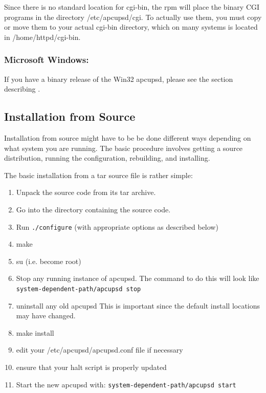 Since there is no standard location for cgi-bin, the rpm will place the binary
CGI programs in the directory /etc/apcupsd/cgi. To actually use them, you must
copy or move them to your actual cgi-bin directory, which on many systems is
located in /home/httpd/cgi-bin. 

\label{Microsoft-Windows}

\subsubsection*{Microsoft Windows:}

\label{index-Installing_002c-Microsoft-21}
If you have a binary release of the Win32 apcupsd, please see the section
describing
.

\label{Installation-from-Source}

\subsection*{Installation from Source}

Installation from source might have to be be done different ways depending on
what system you are running. The basic procedure involves getting a source
distribution, running the configuration, rebuilding, and installing.  

The basic installation from a tar source file is rather simple:  

\begin{enumerate}
\item Unpack the source code from its tar archive.  
\item Go into the directory containing the source code.  
\item Run {\tt ./configure} (with appropriate options as described below)  
\item make  
\item su (i.e. become root)  
\item Stop any running instance of apcupsd.  The command to do this will look
   like {\tt \lt{}system-dependent-path\gt{}/apcupsd stop}  
\item uninstall any old apcupsd This is important since the default install
   locations may have changed.  
\item make install  
\item edit your /etc/apcupsd/apcupsd.conf file if necessary  
\item ensure that your halt script is properly updated  
\item Start the new apcupsd with: {\tt \lt{}system-dependent-path\gt{}/apcupsd
   start}  
   \end{enumerate}

